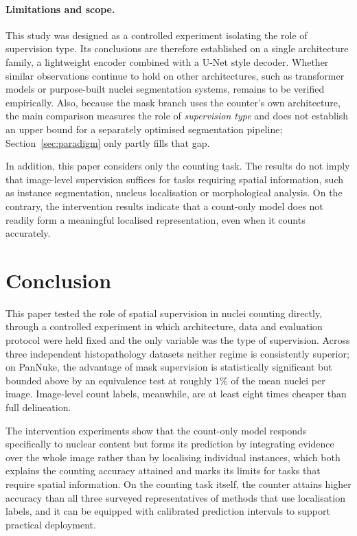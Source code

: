 \documentclass[pdflatex,sn-mathphys-num]{sn-jnl}
\begin{document}
\paragraph{Limitations and scope.} This study was designed as a controlled experiment isolating the role of
supervision type. Its conclusions are therefore established on a single architecture family, a lightweight
encoder combined with a U-Net style decoder. Whether similar observations continue to hold on other
architectures, such as transformer models or purpose-built nuclei segmentation systems, remains to be verified
empirically. Also, because the mask branch uses the counter's own architecture, the main comparison measures
the role of \emph{supervision type} and does not establish an upper bound for a separately optimised
segmentation pipeline; Section~\ref{sec:paradigm} only partly fills that gap.

In addition, this paper considers only the counting task. The results do not imply that image-level supervision
suffices for tasks requiring spatial information, such as instance segmentation, nucleus localisation or
morphological analysis. On the contrary, the intervention results indicate that a count-only model does not
readily form a meaningful localised representation, even when it counts accurately.

\section{Conclusion}\label{sec:conclusion}

This paper tested the role of spatial supervision in nuclei counting directly, through a controlled experiment
in which architecture, data and evaluation protocol were held fixed and the only variable was the type of
supervision. Across three independent histopathology datasets neither regime is consistently superior; on
PanNuke, the advantage of mask supervision is statistically significant but bounded above by an equivalence
test at roughly $1\%$ of the mean nuclei per image. Image-level count labels, meanwhile, are at least eight
times cheaper than full delineation.

The intervention experiments show that the count-only model responds specifically to nuclear content but forms
its prediction by integrating evidence over the whole image rather than by localising individual instances,
which both explains the counting accuracy attained and marks its limits for tasks that require spatial
information. On the counting task itself, the counter attains higher accuracy than all three surveyed
representatives of methods that use localisation labels, and it can be equipped with calibrated prediction
intervals to support practical deployment.
\end{document}
